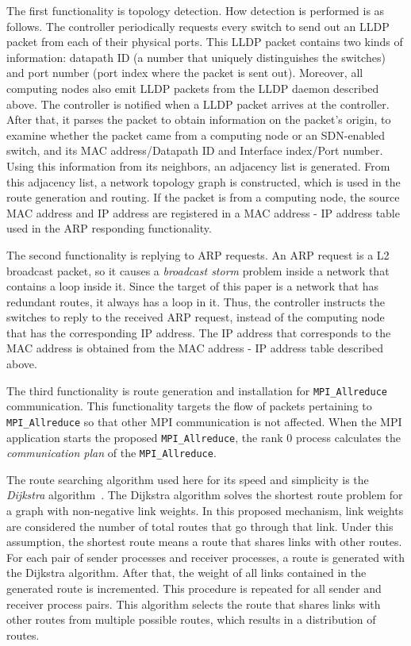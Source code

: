 The first functionality is topology detection. How detection is
performed is as follows. The controller periodically requests every
switch to send out an LLDP packet from each of their physical ports.
This LLDP packet contains two kinds of information: datapath ID (a
number that uniquely distinguishes the switches) and port number (port
index where the packet is sent out). Moreover, all computing nodes also
emit LLDP packets from the LLDP daemon described above. The controller
is notified when a LLDP packet arrives at the controller. After that, it
parses the packet to obtain information on the packet's origin, to
examine whether the packet came from a computing node or an SDN-enabled
switch, and its MAC address/Datapath ID and Interface index/Port number.
Using this information from its neighbors, an adjacency list is
generated. From this adjacency list, a network topology graph is
constructed, which is used in the route generation and routing. If the
packet is from a computing node, the source MAC address and IP address
are registered in a MAC address - IP address table used in the ARP
responding functionality.

The second functionality is replying to ARP requests. An ARP request is
a L2 broadcast packet, so it causes a \emph{broadcast storm} problem
inside a network that contains a loop inside it. Since the target of
this paper is a network that has redundant routes, it always has a loop
in it. Thus, the controller instructs the switches to reply to the
received ARP request, instead of the computing node that has the
corresponding IP address. The IP address that corresponds to the MAC
address is obtained from the MAC address - IP address table described
above.

The third functionality is route generation and installation for
\texttt{MPI\_Allreduce} communication. This functionality targets the
flow of packets pertaining to \texttt{MPI\_Allreduce} so that other MPI
communication is not affected. When the MPI application starts the
proposed \texttt{MPI\_Allreduce}, the rank 0 process calculates the
\emph{communication plan} of the \texttt{MPI\_Allreduce}.

The route searching algorithm used here for its speed and simplicity is
the \emph{Dijkstra} algorithm~\cite{Dijkstra1959}. The Dijkstra
algorithm solves the shortest route problem for a graph with
non-negative link weights. In this proposed mechanism, link weights are
considered the number of total routes that go through that link. Under
this assumption, the shortest route means a route that shares links with
other routes. For each pair of sender processes and receiver processes,
a route is generated with the Dijkstra algorithm. After that, the weight
of all links contained in the generated route is incremented. This
procedure is repeated for all sender and receiver process pairs. This
algorithm selects the route that shares links with other routes from
multiple possible routes, which results in a distribution of routes.

